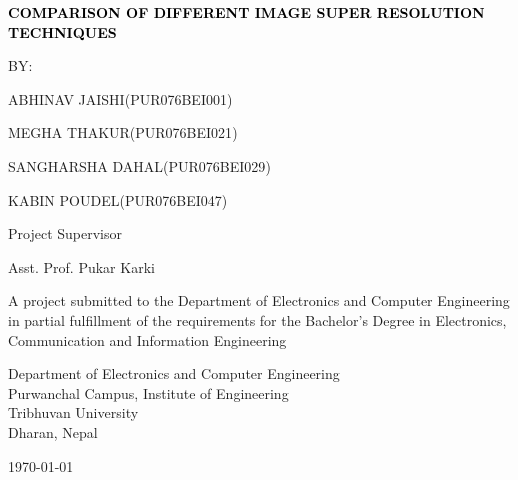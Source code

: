 \newpage
\thispagestyle{empty}
\begin{titlepage}
    \centering
{\fontsize{12pt}{14pt}\bfseries\textcolor{black}{COMPARISON OF DIFFERENT IMAGE SUPER RESOLUTION TECHNIQUES}\par}
\vspace{2.0cm}
       {BY:} \par {ABHINAV JAISHI}({PUR076BEI001})
            \par {MEGHA THAKUR}({PUR076BEI021})
            \par {SANGHARSHA DAHAL}({PUR076BEI029})
            \par {KABIN POUDEL}({PUR076BEI047})
       \vspace{2.0cm}\par
    Project Supervisor\par
    Asst. Prof. Pukar Karki\par
    \vspace{2.0cm}
    {A project submitted to the Department of Electronics and Computer Engineering in partial fulfillment of the requirements for the Bachelor’s Degree in Electronics, Communication and Information Engineering}\par
        \vspace{2.0cm}\par

    {Department of Electronics and Computer Engineering\\ Purwanchal Campus, Institute of Engineering \\ Tribhuvan University\\ Dharan, Nepal}\par
        \vspace{2.0cm}\par
        
        \today
\end{titlepage}